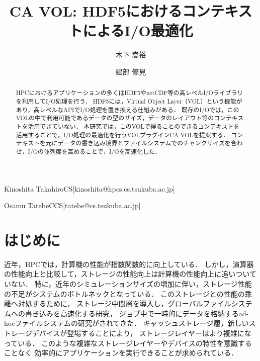 \documentclass[submit,techrep,noauthor]{ipsj}
\begin{document}

\title{CA VOL: HDF5におけるコンテキストによるI/O最適化}

\author{木下 嵩裕}{Kinoshita Takahiro}{CS}[kinoshita@hpcs.cs.tsukuba.ac.jp]
\author{建部 修見}{Osamu Tatebe}{CCS}[tatebe@cs.tsukuba.ac.jp]

\begin{abstract}
	HPCにおけるアプリケーションの多くはHDF5やnetCDF等の高レベルI/Oライブラリを利用してI/O処理を行う．
	HDF5には，Virtual Object Layer（VOL）という機能があり，高レベルなAPIでI/O処理を置き換える仕組みがある．
	既存のI/Oでは，このVOLの中で利用可能であるデータの型のサイズ，データのレイアウト等のコンテキストを活用できていない．
	本研究では，このVOLで得ることのできるコンテキストを活用することで，I/O処理の最適化を行うVOLプラグインCA VOLを提案する．
	コンテキストを元にデータの書き込み境界とファイルシステムでのチャンクサイズを合わせ，I/Oの並列度を高めることで，I/Oを高速化した．
\end{abstract}

\maketitle

\section{はじめに}
近年，HPCでは，計算機の性能が指数関数的に向上している．
しかし，演算器の性能向上と比較して，ストレージの性能向上は計算機の性能向上に追いついていない．
特に，近年のシミュレーションサイズの増加に伴い，ストレージ性能の不足がシステムのボトルネックとなっている．
このストレージとの性能の乖離へ対処するために，
ストレージ中間層を導入し，グローバルファイルシステムへの書き込みを高速化する研究\cite{wang2016burstbuffer,moody2017unifyfs}，
ジョブ中で一時的にデータを格納するad-hocファイルシステム\cite{vef2018gekkofs,tatebe2022chfs}の研究がされてきた．
キャッシュストレージ層，新しいストレージデバイスが登場することにより，
ストレージレイヤーはより複雑になっている．
このような複雑なストレージレイヤーやデバイスの特性を意識することなく
効率的にアプリケーションを実行できることが求められている．
\end{document}
